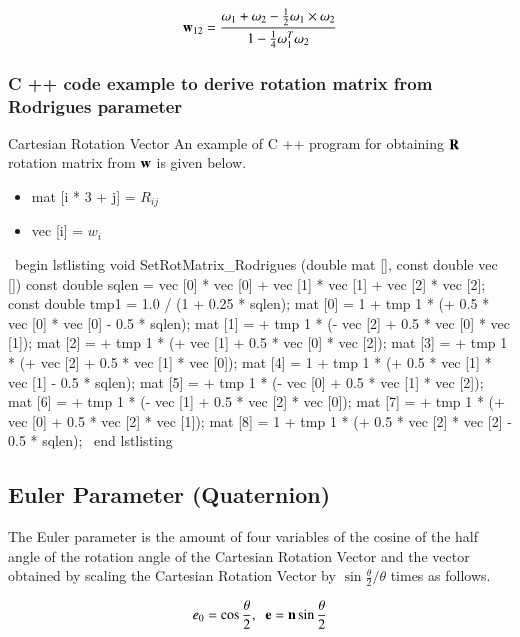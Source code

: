 \begin{equation}
\mathbf{w}_{12}=\frac{\mathbf{\omega}_1+\mathbf{\omega}_2-\frac{1}{2}\mathbf{\omega}_1\times\mathbf{\omega}_2}{1-\frac{1}{4}\omega^T_1\omega_2}
\end{equation}

\subsubsection{C ++ code example to derive rotation matrix from Rodrigues parameter}

Cartesian Rotation Vector An example of C ++ program for obtaining $\mathbf{R}$ rotation matrix from $\mathbf{w}$ is given below.

\begin {itemize}
\item mat [i * 3 + j] = $R_{ij}$
\item vec [i] = $w_i$
\end {itemize}

\ begin {lstlisting}
void SetRotMatrix_Rodrigues (double mat [], const double vec []) {
  const double sqlen = vec [0] * vec [0] + vec [1] * vec [1] + vec [2] * vec [2];
  const double tmp1 = 1.0 / (1 + 0.25 * sqlen);
  mat [0] = 1 + tmp 1 * (+ 0.5 * vec [0] * vec [0] - 0.5 * sqlen);
  mat [1] = + tmp 1 * (- vec [2] + 0.5 * vec [0] * vec [1]);
  mat [2] = + tmp 1 * (+ vec [1] + 0.5 * vec [0] * vec [2]);
  mat [3] = + tmp 1 * (+ vec [2] + 0.5 * vec [1] * vec [0]);
  mat [4] = 1 + tmp 1 * (+ 0.5 * vec [1] * vec [1] - 0.5 * sqlen);
  mat [5] = + tmp 1 * (- vec [0] + 0.5 * vec [1] * vec [2]);
  mat [6] = + tmp 1 * (- vec [1] + 0.5 * vec [2] * vec [0]);
  mat [7] = + tmp 1 * (+ vec [0] + 0.5 * vec [2] * vec [1]);
  mat [8] = 1 + tmp 1 * (+ 0.5 * vec [2] * vec [2] - 0.5 * sqlen);
}
\ end {lstlisting}
\fi




\subsection{Euler Parameter (Quaternion)}

The Euler parameter is the amount of four variables of the cosine of the half angle of the rotation angle of the Cartesian Rotation Vector and the vector obtained by scaling the Cartesian Rotation Vector by $\sin\frac{\theta}{2}/\theta$ times as follows.

\begin{equation}
e_0=\cos\frac{\theta}{2},\;\;\mathbf{e}=\mathbf{n}\sin\frac{\theta}{2}
\end{equation}

